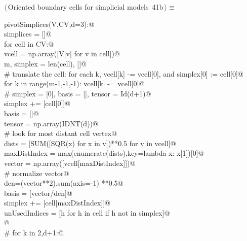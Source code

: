 \documentclass[11pt,oneside]{article}	%
\begin{document}
\begin{flushleft} \small \label{scrap68}
\protect{}$\langle\,$Oriented boundary cells for simplicial models\nobreak\ {\footnotesize 41b}$\,\rangle\equiv$
\vspace{-1ex}
\begin{list}{}{} \item
\mbox{}\verb@def pivotSimplices(V,CV,d=3):@\\
\mbox{}\verb@   simplices = []@\\
\mbox{}\verb@   for cell in CV:@\\
\mbox{}\verb@      vcell = np.array([V[v] for v in cell])@\\
\mbox{}\verb@      m, simplex = len(cell), []@\\
\mbox{}\verb@      # translate the cell: for each k, vcell[k] -= vcell[0], and simplex[0] := cell[0]@\\
\mbox{}\verb@      for k in range(m-1,-1,-1): vcell[k] -= vcell[0]@\\
\mbox{}\verb@      # simplex = [0], basis = [], tensor = Id(d+1)@\\
\mbox{}\verb@      simplex += [cell[0]]@\\
\mbox{}\verb@      basis = []@\\
\mbox{}\verb@      tensor = np.array(IDNT(d))@\\
\mbox{}\verb@      # look for most distant cell vertex@\\
\mbox{}\verb@      dists = [SUM([SQR(x) for x in v])**0.5 for v in vcell]@\\
\mbox{}\verb@      maxDistIndex = max(enumerate(dists),key=lambda x: x[1])[0]@\\
\mbox{}\verb@      vector = np.array([vcell[maxDistIndex]])@\\
\mbox{}\verb@      # normalize vector@\\
\mbox{}\verb@      den=(vector**2).sum(axis=-1) **0.5@\\
\mbox{}\verb@      basis = [vector/den]@\\
\mbox{}\verb@      simplex += [cell[maxDistIndex]]@\\
\mbox{}\verb@      unUsedIndices = [h for h in cell if h not in simplex]@\\
\mbox{}\verb@      @\\
\mbox{}\verb@      # for k in {2,d+1}:@\\

\end{list}
\end{flushleft}
\end{document}
